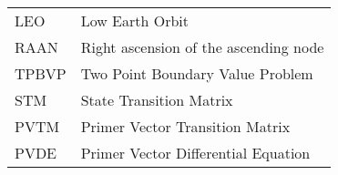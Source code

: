 \begin{longtable}{ll}
LEO & Low Earth Orbit \\
RAAN & Right ascension of the ascending node \\
TPBVP & Two Point Boundary Value Problem \\
STM & State Transition Matrix \\
PVTM & Primer Vector Transition Matrix \\
PVDE & Primer Vector Differential Equation \\
\end{longtable}

